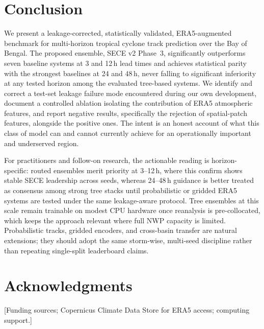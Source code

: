 \documentclass[10pt,twocolumn,a4paper]{article}
\newcommand{\sece}{SECE}
\newcommand{\bob}{Bay of Bengal}
\newcommand{\era}{ERA5}
\begin{document}
\section{Conclusion}
\label{sec:conclusion}
We present a leakage-corrected, statistically validated, \era{}-augmented
benchmark for multi-horizon tropical cyclone track prediction over the \bob{}. The
proposed ensemble, \sece{} v2 Phase~3, significantly outperforms seven baseline
systems at 3 and 12\,h lead times and achieves statistical parity with the
strongest baselines at 24 and 48\,h, never falling to significant inferiority at
any tested horizon among the evaluated tree-based systems. We identify and correct
a test-set leakage failure mode encountered during our own development, document a
controlled ablation isolating the contribution of \era{} atmospheric features, and
report negative results, specifically the rejection of spatial-patch features,
alongside the positive ones. The intent is an honest account of what this class of
model can and cannot currently achieve for an operationally important and
underserved region.

For practitioners and follow-on research, the actionable reading is
horizon-specific: routed ensembles merit priority at 3--12\,h, where this confirm
shows stable \sece{} leadership across seeds, whereas 24--48\,h guidance is better
treated as consensus among strong tree stacks until probabilistic or gridded
\era{} systems are tested under the same leakage-aware protocol. Tree ensembles at
this scale remain trainable on modest CPU hardware once reanalysis is
pre-collocated, which keeps the approach relevant where full NWP capacity is
limited. Probabilistic tracks, gridded encoders, and cross-basin transfer are
natural extensions; they should adopt the same storm-wise, multi-seed discipline
rather than repeating single-split leaderboard claims.

\section*{Acknowledgments}
[Funding sources; Copernicus Climate Data Store for \era{} access; computing support.]
\end{document}
